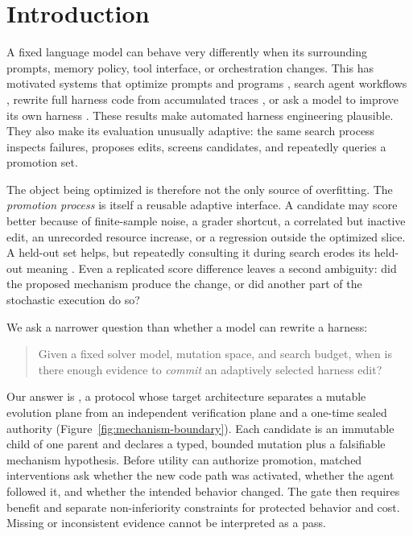 \section{Introduction}
\label{sec:introduction}

A fixed language model can behave very differently when its surrounding
prompts, memory policy, tool interface, or orchestration changes.  This has
motivated systems that optimize prompts and programs
\citep{khattab2023dspy,agrawal2025gepa}, search agent workflows
\citep{hu2025adas}, rewrite full harness code from accumulated traces
\citep{lee2026metaharness,lin2026ahe}, or ask a model to improve its own harness
\citep{zhang2026selfharness}.  These results make automated harness engineering
plausible.  They also make its evaluation unusually adaptive: the same search
process inspects failures, proposes edits, screens candidates, and repeatedly
queries a promotion set.

The object being optimized is therefore not the only source of overfitting.
The \emph{promotion process} is itself a reusable adaptive interface.  A
candidate may score better because of finite-sample noise, a grader shortcut, a
correlated but inactive edit, an unrecorded resource increase, or a regression
outside the optimized slice.  A held-out set helps, but repeatedly consulting
it during search erodes its held-out meaning \citep{dwork2015reusable}.  Even a
replicated score difference leaves a second ambiguity: did the proposed
mechanism produce the change, or did another part of the stochastic execution
do so?

We ask a narrower question than whether a model can rewrite a harness:

\begin{quote}
Given a fixed solver model, mutation space, and search budget, when is there
enough evidence to \emph{commit} an adaptively selected harness edit?
\end{quote}

Our answer is \systemname, a protocol whose target architecture separates a
mutable evolution plane from an independent verification plane and a one-time sealed authority
(Figure~\ref{fig:mechanism-boundary}).  Each candidate is an immutable child of
one parent and declares a typed, bounded mutation plus a falsifiable mechanism
hypothesis.  Before utility can authorize promotion, matched interventions ask
whether the new code path was activated, whether the agent followed it, and
whether the intended behavior changed.  The gate then requires benefit and
separate non-inferiority constraints for protected behavior and cost.  Missing
or inconsistent evidence cannot be interpreted as a pass.

